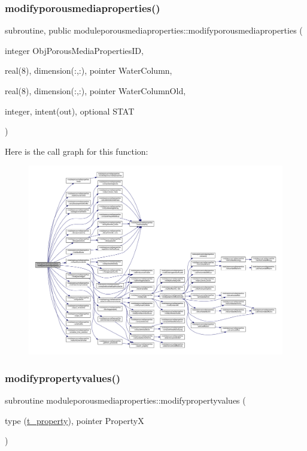 \subsubsection{\texorpdfstring{modifyporousmediaproperties()}{modifyporousmediaproperties()}}
{\footnotesize\ttfamily subroutine, public moduleporousmediaproperties\+::modifyporousmediaproperties (\begin{DoxyParamCaption}\item[{integer}]{Obj\+Porous\+Media\+Properties\+ID,  }\item[{real(8), dimension(\+:,\+:), pointer}]{Water\+Column,  }\item[{real(8), dimension(\+:,\+:), pointer}]{Water\+Column\+Old,  }\item[{integer, intent(out), optional}]{S\+T\+AT }\end{DoxyParamCaption})}

Here is the call graph for this function\+:\nopagebreak
\begin{figure}[H]
\begin{center}
\leavevmode
\includegraphics[width=350pt]{namespacemoduleporousmediaproperties_af5a9da28db32e6f4ed9c06f73a7dc775_cgraph}
\end{center}
\end{figure}
\mbox{\label{namespacemoduleporousmediaproperties_a4a86b3e01bf62024194ec6a00d661a86}} 
\subsubsection{\texorpdfstring{modifypropertyvalues()}{modifypropertyvalues()}}
{\footnotesize\ttfamily subroutine moduleporousmediaproperties\+::modifypropertyvalues (\begin{DoxyParamCaption}\item[{type (\mbox{\hyperlink{structmoduleporousmediaproperties_1_1t__property}{t\+\_\+property}}), pointer}]{PropertyX }\end{DoxyParamCaption})\hspace{0.3cm}{\ttfamily [private]}}

